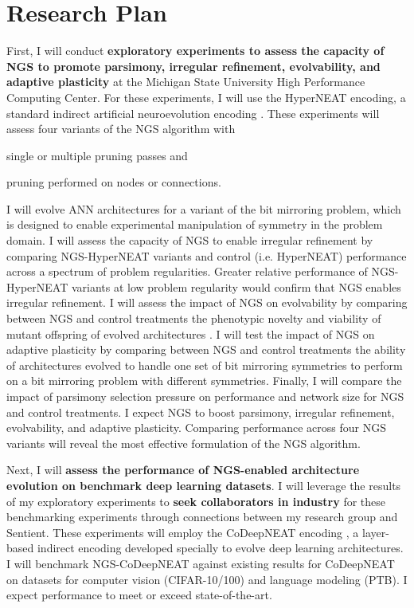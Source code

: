 \section{Research Plan}

First, I will conduct \textbf{exploratory experiments to assess the capacity of NGS to promote parsimony, irregular refinement, evolvability, and adaptive plasticity} at the Michigan State University High Performance Computing Center.
For these experiments, I will use the HyperNEAT encoding, a standard indirect artificial neuroevolution encoding \cite{clune2011performance}.
These experiments will assess four variants of the NGS algorithm with
\begin{enumerate*}[label=(\alph*)]
\item single or multiple pruning passes and
\item pruning performed on nodes or connections.
\end{enumerate*}
I will evolve ANN architectures for a variant of the bit mirroring problem, which is designed to enable experimental manipulation of symmetry in the problem domain.
I will assess the capacity of NGS to enable irregular refinement by comparing NGS-HyperNEAT variants and control (i.e. HyperNEAT) performance across a spectrum of problem regularities.
Greater relative performance of NGS-HyperNEAT variants at low problem regularity would confirm that NGS enables irregular refinement.
I will assess the impact of NGS on evolvability by comparing between NGS and control treatments the phenotypic novelty and viability of mutant offspring of evolved architectures \cite{tarapore2015evolvability}.
I will test the impact of NGS on adaptive plasticity by comparing between NGS and control treatments the ability of architectures evolved to handle one set of bit mirroring symmetries to perform on a bit mirroring problem with different symmetries.
Finally, I will compare the impact of parsimony selection pressure on performance and network size for NGS and control treatments.
I expect NGS to boost parsimony, irregular refinement, evolvability, and adaptive plasticity.
Comparing performance across four NGS variants will reveal the most effective formulation of the NGS algorithm.

Next, I will \textbf{assess the performance of NGS-enabled architecture evolution on benchmark deep learning datasets}.
I will leverage the results of my exploratory experiments to \textbf{seek collaborators in industry} for these benchmarking experiments through connections between my research group and Sentient.
These experiments will employ the CoDeepNEAT encoding \cite{miikkulainen2017evolving}, a layer-based indirect encoding developed specially to evolve deep learning architectures.
I will benchmark NGS-CoDeepNEAT against existing results for CoDeepNEAT on datasets for computer vision (CIFAR-10/100) and language modeling (PTB).
I expect performance to meet or exceed state-of-the-art.
